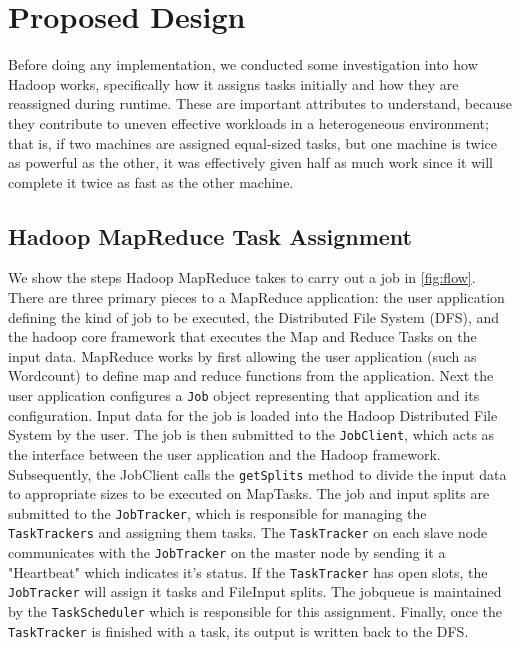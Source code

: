 \section{Proposed Design}
\label{section:propeseddesign}

Before doing any implementation, we conducted some investigation into how Hadoop works, 
specifically how it assigns tasks initially and how they are reassigned during runtime.
These are important attributes to understand, because they contribute to uneven effective
workloads in a heterogeneous environment; that is, if two machines are assigned equal-sized
tasks, but one machine is twice as powerful as the other, it was effectively given half as
much work since it will complete it twice as fast as the other machine.

\subsection{Hadoop MapReduce Task Assignment}

We show the steps Hadoop MapReduce takes to carry out a job in \ref{fig:flow}. There are
three primary pieces to a MapReduce application: the user application defining the kind of job
to be executed, the Distributed File System (DFS), and the hadoop core framework that executes
the Map and Reduce Tasks on the input data. MapReduce 
works by first allowing the user application (such as Wordcount) to define map and reduce functions
from the application.
Next the user application configures a \texttt{Job} object representing that application and its configuration.
Input data for the job is loaded into the Hadoop Distributed File System by the user. 
The job is then submitted to the \texttt{JobClient}, which acts as the interface between the user
application and the Hadoop framework. Subsequently, the JobClient calls the 
\texttt{getSplits} method to divide the input data to appropriate sizes to be executed on MapTasks. The job and
input splits are submitted to the \texttt{JobTracker}, which is responsible for managing the \texttt{TaskTrackers} and assigning them
tasks. The \texttt{TaskTracker} on each slave node communicates with
the \texttt{JobTracker} on the master node by sending it a "Heartbeat" which indicates it's status. If the \texttt{TaskTracker}
has open slots, the \texttt{JobTracker} will assign it tasks and FileInput splits. The jobqueue is maintained by the
\texttt{TaskScheduler} which is responsible for this assignment. Finally, once the \texttt{TaskTracker} is finished
with a task, its output is written back to the DFS.

